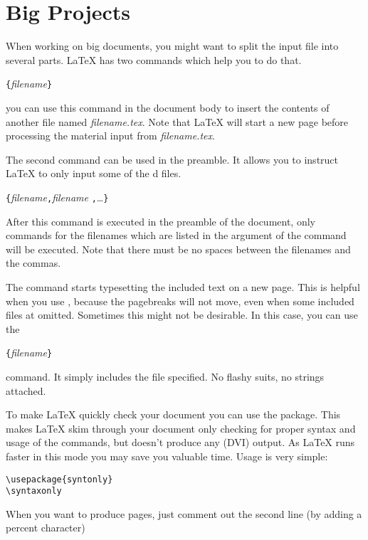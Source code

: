 \section{Big Projects}
When working on big documents, you might want to split the input file
into several parts. \LaTeX{} has two commands which help you to do
that.

\begin{command}
\verb|{|\emph{filename}\verb|}|
\end{command}
\noindent you can use this command in the document body to insert the
contents of another file named \emph{filename.tex}. Note that \LaTeX{}
will start a new page
before processing the material input from \emph{filename.tex}.

The second command can be used in the preamble. It allows you to
instruct \LaTeX{} to only input some of the \verb||d files.
\begin{command}
\verb|{|\emph{filename}\verb|,|\emph{filename}%
\verb|,|\ldots\verb|}|
\end{command}
After this command is executed in the preamble of the document, only
 commands for the filenames which are listed in the
argument of the  command will be executed. Note that
there must be no spaces between the filenames and the commas.

The  command starts typesetting the included text on a new
page. This is helpful when you use , because the
pagebreaks will not move, even when some included files at omitted.
Sometimes this might not be desirable. In this case, you can use the
\begin{command}
\verb|{|\emph{filename}\verb|}|
\end{command}
\noindent command. It simply includes the file specified. 
No flashy suits, no strings attached.


To make \LaTeX{} quickly check your document you can use the 
package. This makes \LaTeX{} skim through your document only checking for
proper syntax and usage of the commands, but doesn't produce any (DVI) output.
As \LaTeX{} runs faster in this mode you may save you valuable time.
Usage is very simple:

\begin{verbatim}
\usepackage{syntonly}
\syntaxonly
\end{verbatim}

When you want to produce pages, just comment out the second line
(by adding a percent character)


